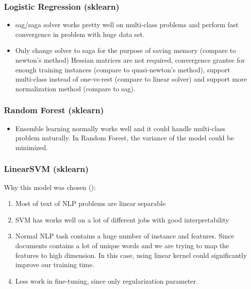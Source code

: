 \documentclass[11pt]{article}
\begin{document}
\subsubsection{Logistic Regression (sklearn)}
\begin{itemize}
      \item 
            sag/saga solver works pretty well on 
            multi-class problems and perform fast convergence in problem with huge data set.

      \item Only change solver to saga for the purpose of saving memory
            (compare to newton's method) Hessian matrices are not required, 
            convergence grantee for enough training instances (compare to 
            quasi-newton's method),
            support multi-class instead of one-vs-rest (compare to linear solver) 
            and support more normalization method (compare to sag).
\end{itemize}

\subsubsection{Random Forest (sklearn)}
\begin{itemize}
      \item Ensemble learning normally works well and 
            it could handle multi-class problem naturally. In Random Forest, the
            variance of the model could be minimized.
\end{itemize}

\subsubsection{LinearSVM (sklearn)}
Why this model was chosen ():
\begin{enumerate}
      \item Most of text of NLP problems are linear separable
      \item SVM has works well on a lot of different jobs with good interpretability
      \item Normal NLP task contains a huge number of instance and features.
            Since documents contains a lot of unique words and we are trying to
            map the features to high dimension. In this case, using linear
            kernel could significantly improve our training time.
      \item Less work in fine-tuning, since only regularization parameter.
\end{enumerate}
\end{document}
